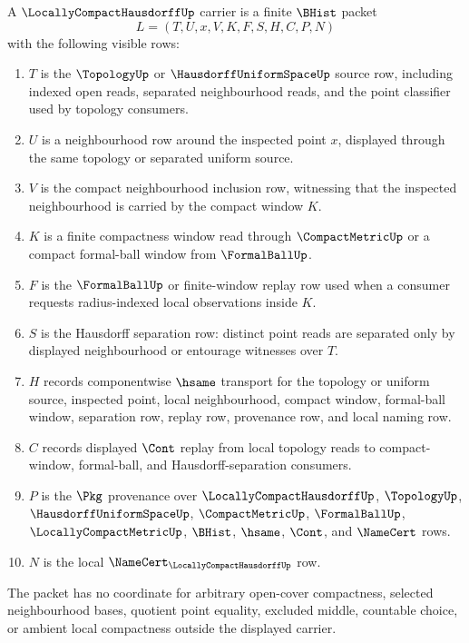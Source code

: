\begin{definition}
\label{def:locally-compact-hausdorff-carrier}
A $\LocallyCompactHausdorffUp$ carrier is a finite $\BHist$ packet
$$
L=(T,U,x,V,K,F,S,H,C,P,N)
$$
with the following visible rows:
\begin{enumerate}
\item $T$ is the $\TopologyUp$ or $\HausdorffUniformSpaceUp$ source row, including indexed open reads, separated neighbourhood reads, and the point classifier used by topology consumers.
\item $U$ is a neighbourhood row around the inspected point $x$, displayed through the same topology or separated uniform source.
\item $V$ is the compact neighbourhood inclusion row, witnessing that the inspected neighbourhood is carried by the compact window $K$.
\item $K$ is a finite compactness window read through $\CompactMetricUp$ or a compact formal-ball window from $\FormalBallUp$.
\item $F$ is the $\FormalBallUp$ or finite-window replay row used when a consumer requests radius-indexed local observations inside $K$.
\item $S$ is the Hausdorff separation row: distinct point reads are separated only by displayed neighbourhood or entourage witnesses over $T$.
\item $H$ records componentwise $\hsame$ transport for the topology or uniform source, inspected point, local neighbourhood, compact window, formal-ball window, separation row, replay row, provenance row, and local naming row.
\item $C$ records displayed $\Cont$ replay from local topology reads to compact-window, formal-ball, and Hausdorff-separation consumers.
\item $P$ is the $\Pkg$ provenance over $\LocallyCompactHausdorffUp$, $\TopologyUp$, $\HausdorffUniformSpaceUp$, $\CompactMetricUp$, $\FormalBallUp$, $\LocallyCompactMetricUp$, $\BHist$, $\hsame$, $\Cont$, and $\NameCert$ rows.
\item $N$ is the local $\NameCert_{\LocallyCompactHausdorffUp}$ row.
\end{enumerate}
The packet has no coordinate for arbitrary open-cover compactness, selected neighbourhood bases, quotient point equality, excluded middle, countable choice, or ambient local compactness outside the displayed carrier.
\end{definition}

